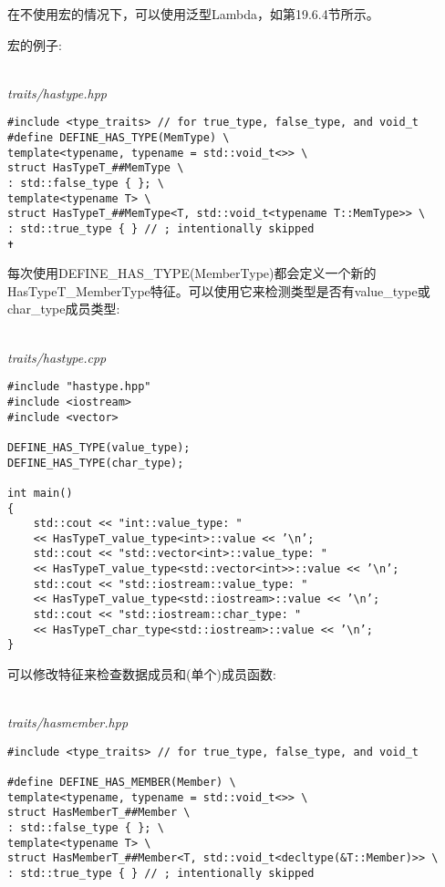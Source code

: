 在不使用宏的情况下，可以使用泛型Lambda，如第19.6.4节所示。

宏的例子:

\hspace*{\fill} \\ %
\noindent
\textit{traits/hastype.hpp}
\begin{lstlisting}[style=styleCXX]
#include <type_traits> // for true_type, false_type, and void_t
#define DEFINE_HAS_TYPE(MemType) \
template<typename, typename = std::void_t<>> \
struct HasTypeT_##MemType \
: std::false_type { }; \
template<typename T> \
struct HasTypeT_##MemType<T, std::void_t<typename T::MemType>> \
: std::true_type { } // ; intentionally skipped
✝ 
\end{lstlisting}

每次使用DEFINE\_HAS\_TYPE(MemberType)都会定义一个新的HasTypeT\_MemberType特征。可以使用它来检测类型是否有value\_type或char\_type成员类型:

\hspace*{\fill} \\ %
\noindent
\textit{traits/hastype.cpp}
\begin{lstlisting}[style=styleCXX]
#include "hastype.hpp"
#include <iostream>
#include <vector>

DEFINE_HAS_TYPE(value_type);
DEFINE_HAS_TYPE(char_type);

int main()
{
	std::cout << "int::value_type: "
	<< HasTypeT_value_type<int>::value << ’\n’;
	std::cout << "std::vector<int>::value_type: "
	<< HasTypeT_value_type<std::vector<int>>::value << ’\n’;
	std::cout << "std::iostream::value_type: "
	<< HasTypeT_value_type<std::iostream>::value << ’\n’;
	std::cout << "std::iostream::char_type: "
	<< HasTypeT_char_type<std::iostream>::value << ’\n’;
}
\end{lstlisting}

\subsubsubsection{19.6.3\hspace{0.2cm}检查非类型成员}

可以修改特征来检查数据成员和(单个)成员函数:

\hspace*{\fill} \\ %
\noindent
\textit{traits/hasmember.hpp}
\begin{lstlisting}[style=styleCXX]
#include <type_traits> // for true_type, false_type, and void_t

#define DEFINE_HAS_MEMBER(Member) \
template<typename, typename = std::void_t<>> \
struct HasMemberT_##Member \
: std::false_type { }; \
template<typename T> \
struct HasMemberT_##Member<T, std::void_t<decltype(&T::Member)>> \
: std::true_type { } // ; intentionally skipped
\end{lstlisting}


